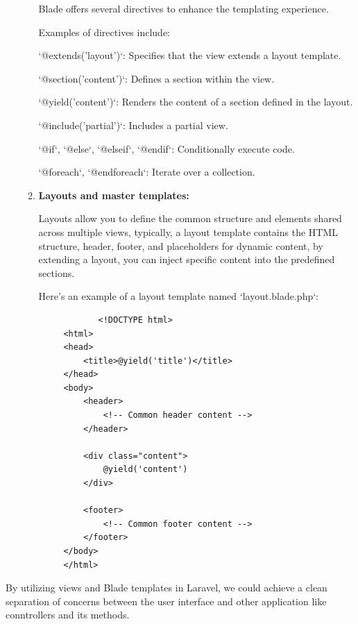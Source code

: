 \begin{itemize}
\begin{enumerate}
        Blade offers several directives to enhance the templating experience.
        
        Examples of directives include:
         
        `@extends('layout')`: Specifies that the view extends a layout template.
        
        `@section('content')`: Defines a section within the view.
        
        `@yield('content')`: Renders the content of a section defined in the layout.
        
        `@include('partial')`: Includes a partial view.
        
        `@if`, `@else`, `@elseif`, `@endif`: Conditionally execute code.
        
        `@foreach`, `@endforeach`: Iterate over a collection.
    
        \item \textbf{Layouts and master templates:}
        
        Layouts allow you to define the common structure and elements shared across multiple views, typically, a layout template contains the HTML structure, header, footer, and placeholders for dynamic content, by extending a layout, you can inject specific content into the predefined sections.
        
        Here's an example of a layout template named `layout.blade.php`:
        \begin{verbatim}
            <!DOCTYPE html>
     <html>
     <head>
         <title>@yield('title')</title>
     </head>
     <body>
         <header>
             <!-- Common header content -->
         </header>

         <div class="content">
             @yield('content')
         </div>

         <footer>
             <!-- Common footer content -->
         </footer>
     </body>
     </html>
        \end{verbatim}
    \end{enumerate}
\end{itemize}
By utilizing views and Blade templates in Laravel, we could achieve a clean separation of concerns between the user interface and other application like conntrollers and its methods.
